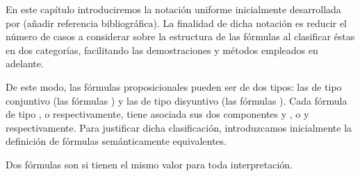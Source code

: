 %
\begin{isabellebody}%
%
%
\isadelimtheory
%
\endisadelimtheory
%
\isatagtheory
%
\endisatagtheory
{\isafoldtheory}%
%
\isadelimtheory
%
\endisadelimtheory
%
\begin{isamarkuptext}%
%
\end{isamarkuptext}\isamarkuptrue%
%
\begin{isamarkuptext}%
En este capítulo introduciremos la notación uniforme inicialmente 
  desarrollada por  (añadir referencia bibliográfica). La finalidad
  de dicha notación es reducir el número de casos a considerar sobre la estructura de 
  las fórmulas al clasificar éstas en dos categorías, facilitando las demostraciones
  y métodos empleados en adelante.


  De este modo, las fórmulas proposicionales pueden ser de dos tipos:
  las de tipo conjuntivo (las fórmulas \isa{{\isasymalpha}}) y las de tipo disyuntivo (las fórmulas \isa{{\isasymbeta}}). 
  Cada fórmula de tipo \isa{{\isasymalpha}}, o \isa{{\isasymbeta}} respectivamente, tiene asociada sus  
  dos componentes  y , o  y  respectivamente. Para justificar dicha clasificación,
  introduzcamos inicialmente la definición de fórmulas semánticamente equivalentes.

  \begin{definicion}
    Dos fórmulas son  si tienen el mismo valor para toda 
    interpretación.
  \end{definicion}


\end{isamarkuptext}
\end{isabellebody}
